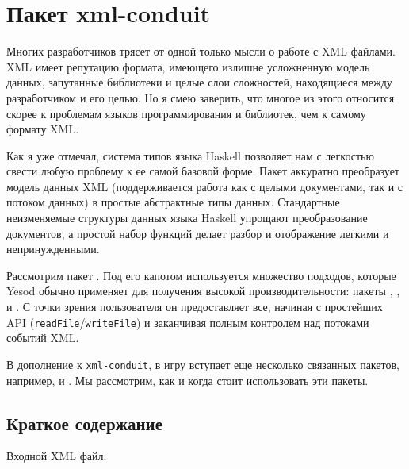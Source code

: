\chapter{Пакет xml-conduit}

Многих разработчиков трясет от одной только мысли о работе с XML файлами. XML имеет репутацию формата, имеющего излишне усложненную модель данных, запутанные библиотеки и целые слои сложностей, находящиеся между разработчиком и его целью. Но я смею заверить, что многое из этого относится скорее к проблемам языков программирования и библиотек, чем к самому формату XML.

Как я уже отмечал, система типов языка Haskell позволяет нам с легкостью свести любую проблему к ее самой базовой форме. Пакет  аккуратно преобразует модель данных XML (поддерживается работа как с целыми документами, так и с потоком данных) в простые абстрактные типы данных. Стандартные неизменяемые структуры данных языка Haskell упрощают преобразование документов, а простой набор функций делает разбор и отображение легкими и непринужденными. %

Рассмотрим пакет . Под его капотом используется множество подходов, которые Yesod обычно применяет для получения высокой производительности: пакеты , ,  и . С точки зрения пользователя он предоставляет все, начиная с простейших API (\lstinline!readFile!/\lstinline!writeFile!) и заканчивая полным контролем над потоками событий XML.

В дополнение к \lstinline!xml-conduit!, в игру вступает еще несколько связанных пакетов, например,  и . Мы рассмотрим, как и когда стоит использовать эти пакеты.

\section{Краткое содержание} %

Входной XML файл:

